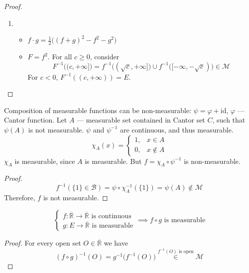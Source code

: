 \begin{proof}
\begin{enumerate}
{        }
        \item {
            \mbox{}
            \begin{itemize}
                \item {
                    $ f \cdot g = \frac{1}{2} \bigl((f + g)^2 - f^2 - g^2\bigr) $
                }
                \item {
                    $F = f^2$. For all $c \ge 0$, consider
                    \[ F^{-1}\bigl((c, +\infty]\bigr) = f^{-1}\bigl((\sqrt{c}, +\infty]\bigr)
                    \cup f^{-1}\bigl([-\infty, -\sqrt{c})\bigr) \in \mathcal{M} \]
                    For $c < 0$, $F^{-1}((c, +\infty)) = E$.
                }
            \end{itemize}
        }
    \end{enumerate}
\end{proof}

\begin{example}
    Composition of measurable functions can be non-measurable:
    $\psi = \varphi + \mathrm{id}$, $\varphi$ --- Cantor function.
    Let $A$ --- measurable set contained in Cantor set $C$, such that
    $\psi(A)$ is not measurable.
    $\psi$ and $\psi^{-1}$ are continuous, and thus measurable.
    \[
        \chi_A(x) = \begin{cases}
            1,& x \in A\\
            0,& x \not\in A
        \end{cases}
    \]
    $\chi_A$ is measurable, since $A$ is measurable.
    But $f = \chi_A \circ \psi^{-1}$ is non-measurable.
\end{example}
\begin{proof}
    \[ f^{-1}(\{1\} \in \mathcal{B}) = \psi \circ \chi_A^{-1}(\{1\}) = \psi(A) \not\in \mathcal{M} \]
    Therefore, $f$ is not measurable.
\end{proof}

\begin{proposition}
    \[
        \begin{cases}
            f : \overline{\mathbb{R}} \to \overline{\mathbb{R}} \text{ is continuous}\\
            g : E \to \overline{\mathbb{R}} \text{ is measurable}
        \end{cases}
        \implies
        f \circ g \text{ is measurable}
    \]
\end{proposition}
\begin{proof}
    For every open set $O \in \overline{\mathbb{R}}$ we have
    \[
        (f \circ g)^{-1}(O) = g^{-1}\bigl(f^{-1}(O)\bigr)
        \overset{f^{-1}(O) \text{ is open}}{\in} \mathcal{M}
    \]
\end{proof}